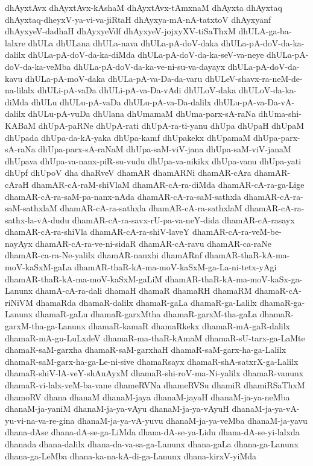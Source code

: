 {dhAyxtAvx
dhAyxtAvx-kAshaM
dhAyxtAvx-tAmxnaM
dhAyxta
dhAyxtaq
dhAyxtaq-dheyxV-ya-vi-va-jiRtaH
dhAyxya-mA-nA-tatxtoV
dhAyxyanf
dhAyxyeV-dadhaH
dhAyxyeVdf
dhAyxyeV-jojxyXV-tiSaThxM
dhULA-ga-ba-lalxre
dhULa
dhULana
dhULa-nava
dhULa-pA-doV-daka
dhULa-pA-doV-da-ka-dalilx
dhULa-pA-doV-da-ka-diMda
dhULa-pA-doV-da-ka-seV-va-neye
dhULa-pA-doV-da-ka-veMba
dhULa-pA-doV-da-ka-ve-ni-su-va-dayayx
dhULa-pA-doV-da-kavu
dhULa-pA-moV-daka
dhULa-pA-va-Da-da-varu
dhULeV-shavx-ra-neM-de-na-lilalx
dhULi-pA-vaDa
dhULi-pA-va-Da-vAdi
dhULoV-daka
dhULoV-da-ka-diMda
dhULu
dhULu-pA-vaDa
dhULu-pA-va-Da-dalilx
dhULu-pA-va-Da-vA-dalilx
dhULu-pA-vuDa
dhUlana
dhUmamaM
dhUma-parx-sA-raNa
dhUma-shi-KABaM
dhUpA-paRNe
dhUpA-rati
dhUpA-ra-ti-yanu
dhUpa
dhUpaH
dhUpaM
dhUpada
dhUpa-da-kA-yaka
dhUpa-kamf
dhUpakekx
dhUpamaM
dhUpa-parx-sA-raNa
dhUpa-parx-sA-raNaM
dhUpa-saM-viV-jana
dhUpa-saM-viV-janaM
dhUpava
dhUpa-va-nanx-piR-su-vudu
dhUpa-va-nikikx
dhUpa-vanu
dhUpa-yati
dhUpf
dhUpoV
dha
dhaRveV
dhamAR
dhamARNi
dhamAR-cAra
dhamAR-cAraH
dhamAR-cA-raM-shiVlaM
dhamAR-cA-ra-diMda
dhamAR-cA-ra-ga-Lige
dhamAR-cA-ra-saM-pa-nanx-nAda
dhamAR-cA-ra-saM-sathxla
dhamAR-cA-ra-saM-sathxlaM
dhamAR-cA-ra-sathxla
dhamAR-cA-ra-sathxlaM
dhamAR-cA-ra-sathx-la-vA-dudu
dhamAR-cA-ra-savx-rU-pa-va-neY-dida
dhamAR-cA-rasayx
dhamAR-cA-ra-shiVla
dhamAR-cA-ra-shiV-laveY
dhamAR-cA-ra-veM-be-nayAyx
dhamAR-cA-ra-ve-ni-sidaR
dhamAR-cA-ravu
dhamAR-ca-raNe
dhamAR-ca-ra-Ne-yalilx
dhamAR-nanxhi
dhamARnf
dhamAR-thaR-kA-ma-moV-kaSxM-gaLa
dhamAR-thaR-kA-ma-moV-kaSxM-ga-La-ni-tetx-yAgi
dhamAR-thaR-kA-ma-moV-kaSxM-gaLiM
dhamAR-thaR-kA-ma-moV-kaSx-ga-Lanunx
dhamA-cA-ra-dali
dhamaH
dhamaR
dhamaRH
dhamaRM
dhamaR-cA-riNiVM
dhamaRda
dhamaR-dalilx
dhamaR-gaLa
dhamaR-ga-Lalilx
dhamaR-ga-Lanunx
dhamaR-gaLu
dhamaR-garxMtha
dhamaR-garxM-tha-gaLa
dhamaR-garxM-tha-ga-Lanunx
dhamaR-kamaR
dhamaRkekx
dhamaR-mA-gaR-dalilx
dhamaR-mA-gu-LuLxdeV
dhamaR-ma-thaR-kAmaM
dhamaR-sU-tarx-ga-LaMte
dhamaR-saM-garxha
dhamaR-saM-garxhaH
dhamaR-saM-garx-ha-ga-Lalilx
dhamaR-saM-garx-ha-ga-Le-ni-sive
dhamaRsayx
dhamaR-shA-satxrX-ga-Lalilx
dhamaR-shiV-lA-veY-shAnAyxM
dhamaR-shi-roV-ma-Ni-yalilx
dhamaR-vanunx
dhamaR-vi-lalx-veM-ba-vane
dhameRVNa
dhameRVSu
dhamiR
dhamiRSaThxM
dhamoRV
dhana
dhanaM
dhanaM-jaya
dhanaM-jayaH
dhanaM-ja-ya-neMba
dhanaM-ja-yaniM
dhanaM-ja-ya-vAyu
dhanaM-ja-ya-vAyuH
dhanaM-ja-ya-vA-yu-vi-na-va-re-gina
dhanaM-ja-ya-vA-yuvu
dhanaM-ja-ya-veMba
dhanaM-ja-yavu
dhana-dAse
dhana-dA-se-ga-LiMda
dhana-dA-se-ya-Lidu
dhana-dA-se-yi-lalxda
dhanada
dhana-dalilx
dhana-da-va-sa-ga-Lanunx
dhana-gaLa
dhana-ga-Lanunx
dhana-ga-LeMba
dhana-ka-na-kA-di-ga-Lanunx
dhana-kirxV-yiMda
}
